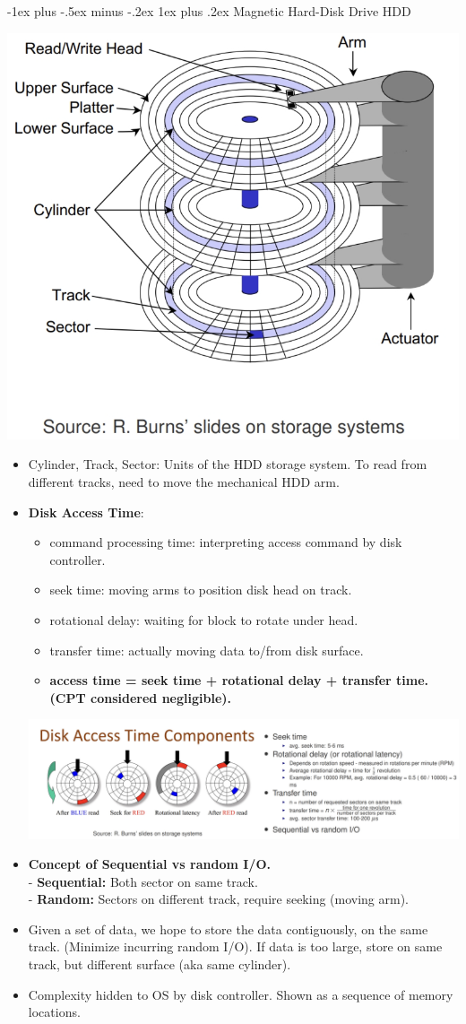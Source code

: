 \documentclass[10pt, landscape]{article}
\makeatletter
\renewcommand{\subsubsection}{\@startsection{subsubsection}{3}{0mm}%
                                {-1ex plus -.5ex minus -.2ex}%
                                {1ex plus .2ex}%
                                {\normalfont\small\bfseries}}
\makeatother
\begin{document}
\begin{multicols*}{3}
\subsubsection{Magnetic Hard-Disk Drive HDD}
\centerline{\includegraphics[width = 0.5\linewidth]{HDD}}
\begin{itemize}
\item Cylinder, Track, Sector: Units of the HDD storage system. To read from different tracks, need to move the mechanical HDD arm.
\item \textbf{Disk Access Time}:
	\begin{itemize}
		\item command processing time: interpreting access command by disk controller.
		\item seek time: moving arms to position disk head on track.
		\item rotational delay: waiting for block to rotate under head.
		\item transfer time: actually moving data to/from disk surface.
		\item \textbf{access time = seek time + rotational delay + transfer time. (CPT considered negligible). }
	\end{itemize}
\centerline{\includegraphics[width = 1\linewidth]{diskAccessTime}}
\item \textbf{Concept of Sequential vs random I/O.} \\
- \textbf{Sequential:} Both sector on same track. \\
- \textbf{Random:} Sectors on different track, require seeking (moving arm).
\item Given a set of data, we hope to store the data contiguously, on the same track. (Minimize incurring random I/O). If data is too large, store on same track, but different surface (aka same cylinder).
\item Complexity hidden to OS by disk controller. Shown as a sequence of memory locations.
\end{itemize}


\end{multicols*}
\end{document}
